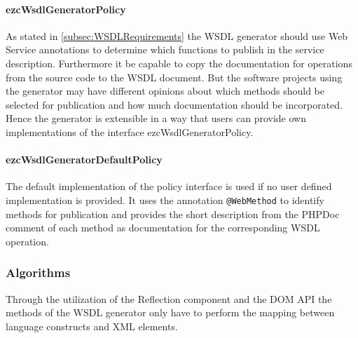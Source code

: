 \documentclass[10pt,final,a4paper,oneside]{article}
\begin{document}
\paragraph{ezcWsdlGeneratorPolicy}
As stated in \ref{subsec:WSDLRequirements}
the WSDL generator should
use Web Service annotations
to determine which functions to publish
in the service description.
Furthermore it be capable to
copy the documentation for operations
from the source code to the WSDL document.
But the software projects using the generator
may have different opinions about
which methods should be selected for publication
and how much documentation should be incorporated.
Hence the generator is extensible in a way
that users can provide own implementations of the
interface ezcWsdlGeneratorPolicy.

\paragraph{ezcWsdlGeneratorDefaultPolicy}
The default implementation of the policy interface
is used if no user defined implementation is provided.
It uses the annotation \verb|@WebMethod|
to identify methods for publication and
provides the short description from the PHPDoc comment
of each method as documentation for
the corresponding WSDL operation.




\subsubsection{Algorithms}
Through the utilization of the Reflection component
and the DOM API the methods of the WSDL generator
only have to perform the mapping between
language constructs and XML elements.
\end{document}

